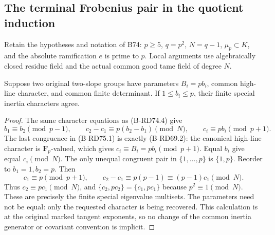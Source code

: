 \subsection{The terminal Frobenius pair in the quotient induction}

Retain the hypotheses and notation of B74: \(p\ge5\),
\(q=p^2\), \(N=q-1\), \(\mu_p\subset K\), and the
absolute ramification \(e\) is prime to \(p\).
Local arguments use algebraically closed residue field and
the actual common good tame field of degree \(N\).

\begin{lemma}
\label{lem:B-RD75-terminal}
Suppose two original two-slope groups have parameters
\(B_i=pb_i\), common high-line character, and common finite
determinant. If \(1\le b_i\le p\), their finite special
inertia characters agree.
\end{lemma}
\begin{proof}
The same character equations as (B-RD74.4) give
\[
 b_1\equiv b_2\pmod{p-1},\qquad
 c_2-c_1\equiv p(b_2-b_1)\pmod N,
 \qquad c_i\equiv pb_i\pmod{p+1}.
 \tag{B-RD75.1}
\]
The last congruence in (B-RD75.1) is exactly (B-RD69.2):
the canonical high-line character is \(\mathbf F_p\)-valued,
which gives \(c_i\equiv B_i=pb_i\pmod{p+1}\).
Equal \(b_i\) give equal \(c_i\pmod N\). The only unequal
congruent pair in \(\{1,\ldots,p\}\) is \(\{1,p\}\).
Reorder to \(b_1=1,b_2=p\). Then
\[
 c_1\equiv p\pmod{p+1},\qquad
 c_2-c_1\equiv p(p-1)\equiv(p-1)c_1\pmod N.
 \tag{B-RD75.2}
\]
Thus \(c_2\equiv pc_1\pmod N\), and
\(\{c_2,pc_2\}=\{c_1,pc_1\}\) because \(p^2\equiv1\pmod N\).
These are precisely the finite special eigenvalue multisets.
The parameters need not be equal: only the requested character
is being recovered. This calculation is at the original
marked tangent exponents, so no change of the common inertia
generator or covariant convention is implicit.
\end{proof}

